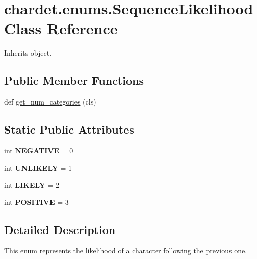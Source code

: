 \hypertarget{classchardet_1_1enums_1_1_sequence_likelihood}{}\section{chardet.\+enums.\+Sequence\+Likelihood Class Reference}
\label{classchardet_1_1enums_1_1_sequence_likelihood}


Inherits object.

\subsection*{Public Member Functions}
\begin{DoxyCompactItemize}
\item 
def \hyperlink{classchardet_1_1enums_1_1_sequence_likelihood_a3a2d2ab17630bed657e7886e53869623}{get\+\_\+num\+\_\+categories} (cls)
\end{DoxyCompactItemize}
\subsection*{Static Public Attributes}
\begin{DoxyCompactItemize}
\item 
\mbox{\label{classchardet_1_1enums_1_1_sequence_likelihood_aa2f8171805d2c2a838a868976be0fcda}} 
int {\bfseries N\+E\+G\+A\+T\+I\+VE} = 0
\item 
\mbox{\label{classchardet_1_1enums_1_1_sequence_likelihood_aff6b26c056a19171b7aeedfb77bb1400}} 
int {\bfseries U\+N\+L\+I\+K\+E\+LY} = 1
\item 
\mbox{\label{classchardet_1_1enums_1_1_sequence_likelihood_a43a98545ee9a374448cb0e7d10cccd43}} 
int {\bfseries L\+I\+K\+E\+LY} = 2
\item 
\mbox{\label{classchardet_1_1enums_1_1_sequence_likelihood_a7f53a5cad3aa0b46628cf4e571a4c78c}} 
int {\bfseries P\+O\+S\+I\+T\+I\+VE} = 3
\end{DoxyCompactItemize}


\subsection{Detailed Description}
\begin{DoxyVerb}This enum represents the likelihood of a character following the previous one.
\end{DoxyVerb}
 

